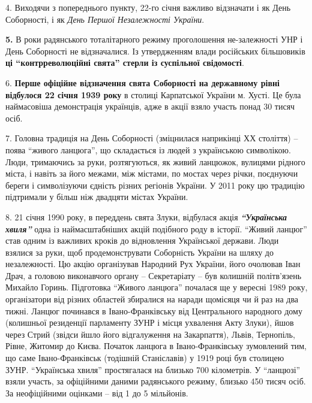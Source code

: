 
4. Виходячи з попереднього пункту, 22-го січня важливо відзначати і як День
Соборності, і як \emph{День Першої Незалежності України}.

\textbf{5.} В роки радянського тоталітарного режиму проголошення не\hyp{}залежності УНР і День
Соборності не відзначалися. Із утвердженням влади російських більшовиків \textbf{ці
\enquote{контрреволюційні свята} стерли із суспільної свідомості}.

6. \textbf{Перше офіційне відзначення свята Соборності на державному рівні відбулося 22
січня 1939 року} в столиці Карпатської України м. Хусті. Це була наймасовіша
демонстрація українців, адже в акції взяло участь понад 30 тисяч осіб.


7. Головна традиція на День Соборності (зміцнилася наприкінці ХХ століття) –
поява \enquote{живого ланцюга}, що складається із людей з українською символікою. Люди,
тримаючись за руки, розтягуються, як живий ланцюжок, вулицями рідного міста, і
навіть за його межами, між містами, по мостах через річки, поєднуючи береги і
символізуючи єдність різних регіонів України. У 2011 року цю традицію
підтримали у більш ніж двадцяти містах України.

8. 21 січня 1990 року, в переддень свята Злуки, відбулася акція \textbf{\emph{\enquote{Українська
хвиля}}} одна із наймасштабніших акцій подібного роду в історії. \enquote{Живий ланцюг}
став одним із важливих кроків до відновлення Української держави. Люди взялися
за руки, щоб продемонструвати Соборність України на шляху до незалежності. Цю
акцію організував Народний Рух України, його очолював Іван Драч, а головою
виконавчого органу – Секретаріату – був колишній політв'язень Михайло Горинь.
Підготовка \enquote{Живого ланцюга} почалася ще у вересні 1989 року, організатори від
різних областей збиралися на наради щомісяця чи й раз на два тижні. Ланцюг
починався в Івано-Франківську від Центрального народного дому (колишньої
резиденції парламенту ЗУНР і місця ухвалення Акту Злуки), йшов через Стрий
(звідси йшло його відгалуження на Закарпаття), Львів, Тернопіль, Рівне, Житомир
до Києва. Початок ланцюга в Івано-Франківську зумовлений тим, що саме
Івано-Франківськ (тодішній Станіславів) у 1919 році був столицею ЗУНР.
\enquote{Українська хвиля} простягалася на близько 700 кілометрів. У \enquote{ланцюзі} взяли
участь, за офіційними даними радянського режиму, близько 450 тисяч осіб. За
неофіційними оцінками – від 1 до 5 мільйонів.


